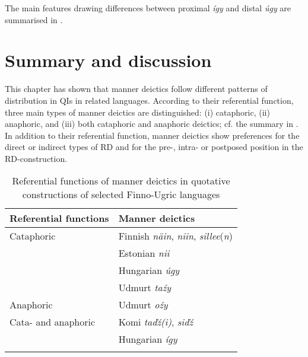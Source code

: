 \documentclass[output=paper,colorlinks,citecolor=brown]{langscibook}
\begin{document}
The main features drawing differences between proximal \textit{így} and distal \textit{úgy} are summarised in .

\begin{table}
\caption{Features of manner deictics in Hungarian QIs}\label{tab:teptiuk:4}
\end{table}

\section{Summary and discussion}\label{sec:teptiuk:5}

This chapter has shown that manner deictics follow different patterns of distribution in QIs in related languages. According to their referential function, three main types of manner deictics are distinguished: (i) cataphoric, (ii) anaphoric, and (iii) both cataphoric and anaphoric deictics; cf. the summary in . In addition to their referential function, manner deictics show preferences for the direct or indirect types of RD and for the pre-, intra- or postposed position in the RD-construction.

\begin{table}
\begin{tabularx}{\textwidth}{Xl}
\lsptoprule
\textbf{Referential functions} & \textbf{Manner deictics}\\
\midrule 
Cataphoric & Finnish \textit{näin}, \textit{niin}, \textit{sillee}(\textit{n})\\
& Estonian \textit{nii}\\
& Hungarian \textit{úgy}\\
& Udmurt \textit{taźy}\\
\tablevspace
 Anaphoric & Udmurt \textit{oźy}\\
\tablevspace
Cata- and anaphoric & Komi \textit{taďź(i)}, \textit{siďź}\\
& Hungarian \textit{így}\\
\lspbottomrule
\end{tabularx}
\caption{Referential functions of manner deictics in quotative constructions of selected Finno-Ugric languages}\label{tab:teptiuk:5}
\end{table}
\end{document}
